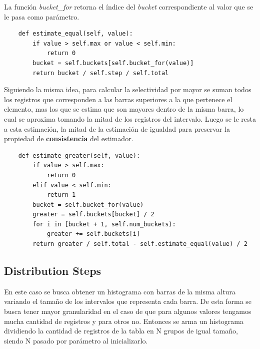 \documentclass[a4paper, 10pt, twoside]{article}
\begin{document}
La función \textit{bucket\_for} retorna el índice del \textit{bucket} correspondiente al valor que se le pasa como parámetro.

\begin{verbatim}
    def estimate_equal(self, value):
        if value > self.max or value < self.min:
            return 0
        bucket = self.buckets[self.bucket_for(value)]
        return bucket / self.step / self.total

\end{verbatim}

Siguiendo la misma idea, para calcular la selectividad por mayor se suman todos los
registros que corresponden a las barras superiores a la que pertenece el elemento, mas los que se estima que son mayores dentro de la misma barra, lo cual se aproxima tomando la mitad de los registros del intervalo. 
Luego se le resta a esta estimación, la mitad de la estimación de igualdad para preservar la propiedad de \textbf{consistencia} del estimador.

\begin{verbatim}
    def estimate_greater(self, value):
        if value > self.max:
            return 0
        elif value < self.min:
            return 1
        bucket = self.bucket_for(value)
        greater = self.buckets[bucket] / 2
        for i in [bucket + 1, self.num_buckets):
            greater += self.buckets[i]
        return greater / self.total - self.estimate_equal(value) / 2
\end{verbatim}


\subsection{Distribution Steps}

En este caso se busca obtener un histograma con barras de la misma altura variando el
tamaño de los intervalos que representa cada barra. De esta forma se busca tener mayor
 granularidad en el caso de que para algunos valores tengamos mucha cantidad de
 registros y para otros no. Entonces se arma un histograma dividiendo la cantidad de
 registros de la tabla en N grupos de igual tamaño, siendo N pasado por parámetro al
 inicializarlo. 
 
\end{document}
